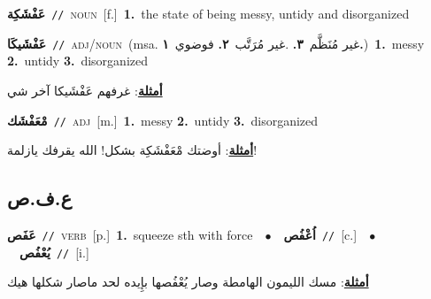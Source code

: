 \documentclass[10pt,a4paper,twoside]{article} %
\begin{document}
\begin{multicols}{2}
{\setlength\topsep{0pt}\textbf{\foreignlanguage{arabic}{عَفْشَكِة}}\ {\color{gray}\texttt{//}\color{black}}\ \textsc{noun}\ [f.]\ \textbf{1.}~the state of being messy, untidy and disorganized\ } \vspace{2mm}

{\setlength\topsep{0pt}\textbf{\foreignlanguage{arabic}{عَفْشَيكَا}}\ {\color{gray}\texttt{//}\color{black}}\ \textsc{adj/noun}\ \color{gray}(msa. \foreignlanguage{arabic}{غير مُنَظَّم}~\foreignlanguage{arabic}{\textbf{٣.}}  .\foreignlanguage{arabic}{غير مُرَتَّب}~\foreignlanguage{arabic}{\textbf{٢.}}  \foreignlanguage{arabic}{فوضوي}~\foreignlanguage{arabic}{\textbf{١.}})\color{black}\ \textbf{1.}~messy  \textbf{2.}~untidy  \textbf{3.}~disorganized\  \begin{flushright}\color{gray}\foreignlanguage{arabic}{\textbf{\underline{\foreignlanguage{arabic}{أمثلة}}}: غرفهم عَفْشَيكا آخر شي}\end{flushright}\color{black}} \vspace{2mm}

{\setlength\topsep{0pt}\textbf{\foreignlanguage{arabic}{مْعَفْشَك}}\ {\color{gray}\texttt{//}\color{black}}\ \textsc{adj}\ [m.]\ \textbf{1.}~messy  \textbf{2.}~untidy  \textbf{3.}~disorganized\  \begin{flushright}\color{gray}\foreignlanguage{arabic}{\textbf{\underline{\foreignlanguage{arabic}{أمثلة}}}: أوضتك مْعَفْشَكِة بشكل! الله يقرفك يازلمة!}\end{flushright}\color{black}} \vspace{2mm}

\vspace{-3mm}
\subsection*{\color{blue}\foreignlanguage{arabic}{ع.ف.ص}\color{blue}{}} 

{\setlength\topsep{0pt}\textbf{\foreignlanguage{arabic}{عَفَص}}\ {\color{gray}\texttt{//}\color{black}}\ \textsc{verb}\ [p.]\ \textbf{1.}~squeeze sth with force\ \ $\bullet$\ \ \setlength\topsep{0pt}\textbf{\foreignlanguage{arabic}{اُعْفُص}}\ {\color{gray}\texttt{//}\color{black}}\ [c.]\ \ $\bullet$\ \ \setlength\topsep{0pt}\textbf{\foreignlanguage{arabic}{يُعْفُص}}\ {\color{gray}\texttt{//}\color{black}}\ [i.]\  \begin{flushright}\color{gray}\foreignlanguage{arabic}{\textbf{\underline{\foreignlanguage{arabic}{أمثلة}}}: مسك الليمون الهامطة وصار يُعْفُصها بإِيده لحد ماصار شكلها هيك}\end{flushright}\color{black}} \vspace{2mm}


\end{multicols}
\end{document}
